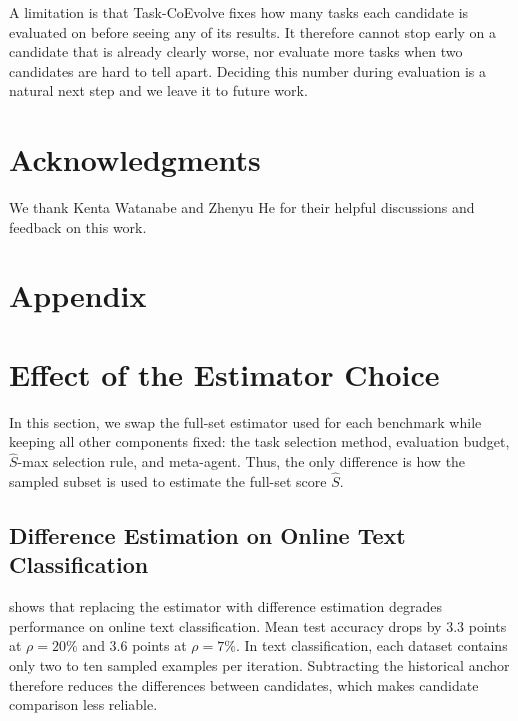 \documentclass{article} %
\begin{document}
A limitation is that Task-CoEvolve fixes how many tasks each candidate is evaluated on before seeing any of its results. It therefore cannot stop early on a candidate that is already clearly worse, nor evaluate more tasks when two candidates are hard to tell apart. Deciding this number during evaluation is a natural next step and we leave it to future work.


\section*{Acknowledgments}
We thank Kenta Watanabe and Zhenyu He for their helpful discussions and feedback on this work.




\clearpage
\appendix
\newcommand\beginsupplement{%
        \setcounter{table}{0}
        \renewcommand{\thetable}{\Alph{table}}%
        \setcounter{figure}{0}
        \renewcommand{\thefigure}{\Alph{figure}}%
     }
\beginsupplement
\section*{Appendix}

\section{Effect of the Estimator Choice}
\label{app:estimator_swap}
In this section, we swap the full-set estimator used for each benchmark while keeping all other components fixed: the task selection method, evaluation budget, $\hat{S}$-max selection rule, and meta-agent. Thus, the only difference is how the sampled subset is used to estimate the full-set score $\hat{S}$.

\subsection{Difference Estimation on Online Text Classification}

 shows that replacing the estimator with difference estimation degrades performance on online text classification. Mean test accuracy drops by $3.3$ points at $\rho{=}20\%$ and $3.6$ points at $\rho{=}7\%$.
In text classification, each dataset contains only two to ten sampled examples per iteration. Subtracting the historical anchor therefore reduces the differences between candidates, which makes candidate comparison less reliable.
\end{document}
